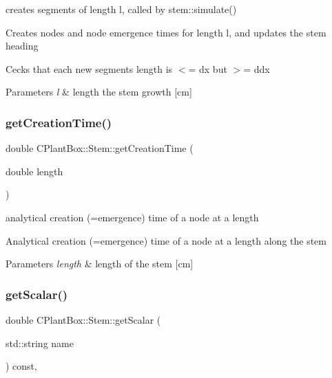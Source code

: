 creates segments of length l, called by stem\+::simulate() 

Creates nodes and node emergence times for length l, and updates the stem heading

Cecks that each new segments length is $<$= dx but $>$= ddx


\begin{DoxyParams}{Parameters}
{\em l} & length the stem growth \mbox{[}cm\mbox{]} \\
\hline
\end{DoxyParams}
\mbox{\label{classCPlantBox_1_1Stem_af949f244eede3d43d189213e59e6ecc1}} 
\subsubsection{\texorpdfstring{get\+Creation\+Time()}{getCreationTime()}}
{\footnotesize\ttfamily double C\+Plant\+Box\+::\+Stem\+::get\+Creation\+Time (\begin{DoxyParamCaption}\item[{double}]{length }\end{DoxyParamCaption})}



analytical creation (=emergence) time of a node at a length 

Analytical creation (=emergence) time of a node at a length along the stem


\begin{DoxyParams}{Parameters}
{\em length} & length of the stem \mbox{[}cm\mbox{]} \\
\hline
\end{DoxyParams}
\mbox{\label{classCPlantBox_1_1Stem_ace47428771936118b0775ca9d23e5f4f}} 
\subsubsection{\texorpdfstring{get\+Scalar()}{getScalar()}}
{\footnotesize\ttfamily double C\+Plant\+Box\+::\+Stem\+::get\+Scalar (\begin{DoxyParamCaption}\item[{std\+::string}]{name }\end{DoxyParamCaption}) const\hspace{0.3cm}{\ttfamily [override]}, {\ttfamily [virtual]}}



